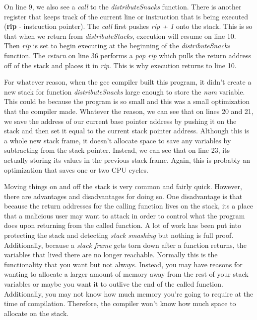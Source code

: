 \documentclass[../main.tex]{subfiles}
\begin{document}
	On line 9, we also see a \textit{call} to the \textit{distributeSnacks} function.  There is another register that keeps track of the current line or instruction that is being executed (\textbf{rip} - instruction pointer).  The \textit{call} first pushes \textit{rip + 1} onto the stack. This is so that when we return from \textit{distributeStacks}, execution will resume on line 10.  Then \textit{rip} is set to begin executing at the beginning of the \textit{distributeSnacks} function.  The \textit{return} on line 36 performs a \textit{pop rip} which pulls the return address off of the stack and places it in \textit{rip}.  This is why execution returns to line 10.
	
	For whatever reason, when the gcc compiler built this program, it didn't create a new stack for function \textit{distributeSnacks} large enough to store the \textit{num} variable.  This could be because the program is so small and this was a small optimization that the compiler made.  Whatever the reason, we can see that on lines 20 and 21, we save the address of our current base pointer address by pushing it on the stack and then set it equal to the current stack pointer address.  Although this is a whole new stack frame, it doesn't allocate space to save any variables by subtracting from the stack pointer.  Instead, we can see that on line 23, its actually storing its values in the previous stack frame.  Again, this is probably an optimization that saves one or two CPU cycles.
	
	Moving things on and off the stack is very common and fairly quick.  However, there are advantages and disadvantages for doing so.  One disadvantage is that because the return addresses for the calling function lives on the stack, its a place that a malicious user may want to attack in order to control what the program does upon returning from the called function.  A lot of work has been put into protecting the stack and detecting \textit{stack smashing} but nothing is full proof.  Additionally, because a \textit{stack frame} gets torn down after a function returns, the variables that lived there are no longer reachable.  Normally this is the functionality that you want but not always.  Instead, you may have reasons for wanting to allocate a larger amount of memory away from the rest of your stack variables or maybe you want it to outlive the end of the called function.  Additionally, you may not know how much memory you're going to require at the time of compilation.  Therefore, the compiler won't know how much space to allocate on the stack.
	
\end{document}
